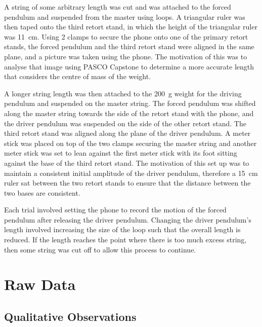 \documentclass[letterpaper, 12pt]{article}
\begin{document}
A string of some arbitrary length was cut and
was attached to the forced pendulum and suspended
from the master using loops. A triangular ruler
was then taped onto the third retort stand,
in which the height of the triangular ruler was
\SI{11}{cm}. Using 2 clamps to secure the phone onto one
of the primary retort stands, the forced pendulum
and the third retort stand were aligned in the
same plane, and a picture was taken using the phone.
The motivation of this was to analyse
that image using PASCO Capstone to determine
a more accurate length that
considers the centre of mass of the weight.

A longer string length was then attached
to the \SI{200}{g} weight for the driving
pendulum and suspended on the master string.
The forced pendulum was shifted along the
master string towards the side of the retort
stand with the phone, and the driver pendulum
was suspended on the side of the other
retort stand. The third retort stand
was aligned along the plane of the
driver pendulum. A meter stick was placed
on top of the two clamps securing the master
string and another meter stick was
set to lean against the first meter stick
with its foot sitting against the base
of the third retort stand. The motivation
of this set up was to maintain a consistent
initial amplitude of the driver
pendulum, therefore a \SI{15}{cm}
ruler sat between the two
retort stands to ensure that the distance between
the two bases are consistent.

Each trial involved setting the phone
to record the motion of the forced
pendulum after releasing the driver
pendulum. Changing the driver pendulum's
length involved increasing the size of the loop
such that the overall length is reduced.
If the length reaches the point where
there is too much excess string, then
some string was cut off to allow this process
to continue.



\section{Raw Data}

\subsection{Qualitative Observations}
\end{document}
